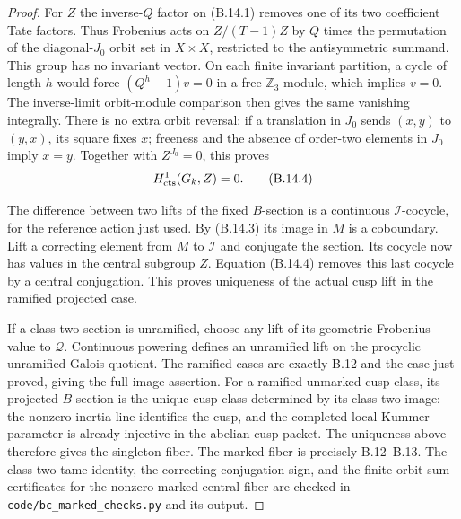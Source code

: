 \begin{proof}
For $Z$ the inverse-$Q$ factor on (B.14.1)
removes one of its two coefficient Tate
factors. Thus Frobenius acts on
$Z/(T-1)Z$ by $Q$ times the permutation
of the diagonal-$J_0$ orbit set in
$X\times X$, restricted to the antisymmetric
summand. This group has no invariant vector.
On each finite invariant partition,
a cycle of length $h$ would force
$(Q^h-1)v=0$ in a free $\mathbb Z_3$-module,
which implies $v=0$.
The inverse-limit orbit-module comparison
then gives the same vanishing integrally.
There is no extra orbit reversal: if a
translation in $J_0$ sends $(x,y)$ to
$(y,x)$, its square fixes $x$; freeness
and the absence of order-two elements in
$J_0$ imply $x=y$.
Together with $Z^{J_0}=0$, this proves
\[
                      H^1_{\rm cts}(G_k,Z)=0.              \tag{B.14.4}
\]

The difference between two lifts of the
fixed $B$-section is a continuous
$\mathscr I$-cocycle, for the reference
action just used.
By (B.14.3) its image in $M$ is a
coboundary. Lift a correcting element
from $M$ to $\mathscr I$ and conjugate
the section. Its cocycle now has values
in the central subgroup $Z$.
Equation (B.14.4) removes this last
cocycle by a central conjugation.
This proves uniqueness of the actual
cusp lift in the ramified projected case.

If a class-two section is unramified,
choose any lift of its geometric
Frobenius value to $\mathscr Q$.
Continuous powering defines an
unramified lift on the procyclic
unramified Galois quotient.
The ramified cases are exactly B.12
and the case just proved, giving the
full image assertion.
For a ramified unmarked cusp class,
its projected $B$-section is the unique
cusp class determined by its class-two
image: the nonzero inertia line identifies
the cusp, and the completed local
Kummer parameter is already injective
in the abelian cusp packet.
The uniqueness above therefore gives
the singleton fiber.
The marked fiber is precisely B.12--B.13.
The class-two tame identity, the correcting-conjugation
sign, and the finite orbit-sum certificates for the
nonzero marked central fiber are checked in
\texttt{code/bc\_marked\_checks.py} and its output.
\end{proof}

